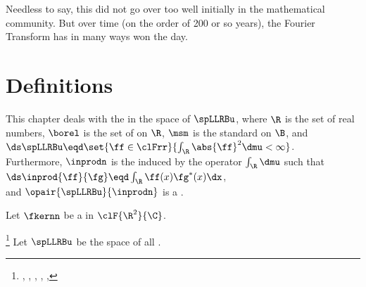 Needless to say, this did not go over too well initially in the mathematical community. 
But over time (on the order of 200 or so years), the Fourier Transform has in many ways won the day.

\section{Definitions}
This chapter deals with the  in the space of 
 $\spLLRBu$,
where $\R$ is the set of real numbers, $\borel$ is the set of  on $\R$, 
$\msm$ is the standard  on $\B$, and 
\\\indentx$\ds\spLLRBu\eqd\set{\ff\in\clFrr}{\int_\R \abs{\ff}^2 \dmu < \infty}$.\\
Furthermore, $\inprodn$ is the  induced by the operator $\int_\R\dmu$ such that 
\\\indentx$\ds\inprod{\ff}{\fg} \eqd \int_{\R}\ff(x)\fg^\ast(x)\dx$,\\
and $\opair{\spLLRBu}{\inprodn}$ is a .

\begin{definition}
\label{def:fkern}
Let $\fkernn$ be a  in $\clF{\R^2}{\C}$.
\end{definition}

\begin{definition}
\footnote{
  ,
  ,
  ,
  ,
  ,
  }
\label{def:ft}
\label{def:opFT}
Let $\spLLRBu$ be the space of all 
.\\
\end{definition}

